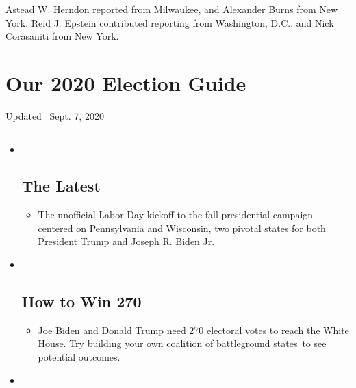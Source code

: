 Astead W. Herndon reported from Milwaukee, and Alexander Burns from New
York. Reid J. Epstein contributed reporting from Washington, D.C., and
Nick Corasaniti from New York.

\hypertarget{our-2020-election-guide}{%
\section{Our 2020 Election Guide}\label{our-2020-election-guide}}

Updated ~Sept. 7, 2020

\begin{center}\rule{0.5\linewidth}{\linethickness}\end{center}

\begin{itemize}
\item ~
  \hypertarget{the-latest}{%
  \subsection{The Latest}\label{the-latest}}

  \begin{itemize}
  \item
    The unofficial Labor Day kickoff to the fall presidential campaign
    centered on Pennsylvania and Wisconsin,
    \href{https://www.nytimes3xbfgragh.onion/2020/09/07/us/politics/wisconsin-biden-harris-trump-pence.html?action=click\&pgtype=Article\&state=default\&region=BELOW_MAIN_CONTENT\&context=storylines_guide}{two
    pivotal states for both President Trump and Joseph R. Biden Jr}.
  \end{itemize}
\item ~
  \hypertarget{how-to-win-270}{%
  \subsection{How to Win 270}\label{how-to-win-270}}

  \begin{itemize}
  \item
    Joe Biden and Donald Trump need 270 electoral votes to reach the
    White House. Try building
    \href{https://www.nytimes3xbfgragh.onion/interactive/2020/us/elections/election-states-biden-trump.html?action=click\&pgtype=Article\&state=default\&region=BELOW_MAIN_CONTENT\&context=storylines_guide}{your
    own coalition of battleground states}~to see potential outcomes.
  \end{itemize}
\item ~
  \hypertarget{voting-by-mail}{%
}
\end{itemize}
